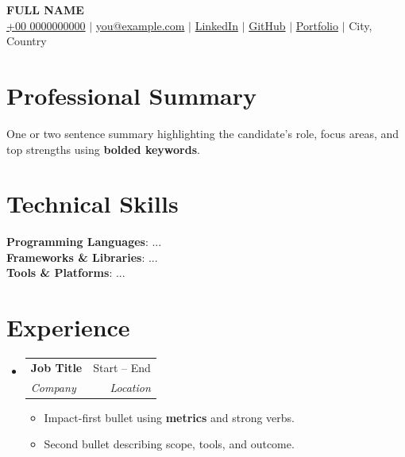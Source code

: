 \documentclass[letterpaper,11pt]{article}
\makeatletter
\newcommand{\resumeItem}[1]{
  \item\small{
    {#1 \vspace{-2pt}}
  }
}
\newcommand{\resumeSubheading}[4]{
  \vspace{-2pt}\item
  \begin{tabular*}{0.97\textwidth}[t]{l@{\extracolsep{\fill}}r}
    \textbf{\color{darkblue}#1} & #2 \\
    \textit{\small#3} & \textit{\small #4} \\
  \end{tabular*}\vspace{-7pt}
}
\newcommand{\resumeSubHeadingListStart}{\begin{itemize}[leftmargin=0.15in, label={}]}
\newcommand{\resumeSubHeadingListEnd}{\end{itemize}}
\newcommand{\resumeItemListStart}{\begin{itemize}}
\newcommand{\resumeItemListEnd}{\end{itemize}\vspace{-5pt}}
\makeatother
\begin{document}
\begin{center}
  \textbf{\Huge \scshape \color{darkturquoise} FULL NAME} \\ \vspace{3pt}
  \small
  \faMobile \hspace{.5pt} \href{tel:0000000000}{+00 0000000000}
  $|$
  \faAt \hspace{.5pt} \href{mailto:you@example.com}{you@example.com}
  $|$
  \faLinkedinSquare \hspace{.5pt} \href{https://www.linkedin.com/in/your-handle/}{LinkedIn}
  $|$
  \faGithub \hspace{.5pt} \href{https://github.com/your-handle}{GitHub}
  $|$
  \faGlobe \hspace{.5pt} \href{https://your-portfolio.example}{Portfolio}
  $|$
  \faMapMarker \hspace{.5pt}
  {City, Country}
\end{center}

\section{Professional Summary}
\noindent One or two sentence summary highlighting the candidate's role, focus areas, and top strengths using \textbf{bolded keywords}.

\section{Technical Skills}
\begin{itemize}[leftmargin=0.15in, label={}]
  \small{\item{
      \textbf{\color{darkblue}Programming Languages}{: ...} \\
      \textbf{\color{darkblue}Frameworks \& Libraries}{: ...} \\
      \textbf{\color{darkblue}Tools \& Platforms}{: ...}
  }}
\end{itemize}

\section{Experience}
  \resumeSubHeadingListStart
    \resumeSubheading
      {Job Title}{Start -- End}
      {Company}{Location}
      \resumeItemListStart
        \resumeItem{Impact-first bullet using \textbf{metrics} and strong verbs.}
        \resumeItem{Second bullet describing scope, tools, and outcome.}
      \resumeItemListEnd
  \resumeSubHeadingListEnd
\end{document}
